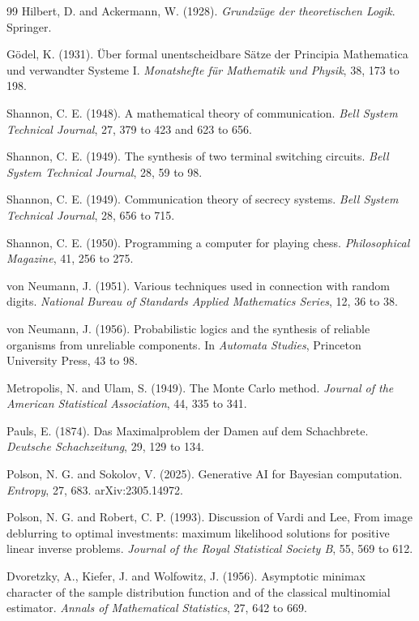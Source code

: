 \documentclass[11pt,twoside,openany]{book}
\theoremstyle{plain}
\theoremstyle{definition}
\theoremstyle{remark}
\begin{document}
\begin{thebibliography}{99}
 Hilbert, D. and Ackermann, W. (1928). \emph{Grundz\"uge der theoretischen Logik}. Springer.

 G\"odel, K. (1931). \"Uber formal unentscheidbare S\"atze der Principia Mathematica und verwandter Systeme I. \emph{Monatshefte f\"ur Mathematik und Physik}, 38, 173 to 198.

 Shannon, C. E. (1948). A mathematical theory of communication. \emph{Bell System Technical Journal}, 27, 379 to 423 and 623 to 656.

 Shannon, C. E. (1949). The synthesis of two terminal switching circuits. \emph{Bell System Technical Journal}, 28, 59 to 98.

 Shannon, C. E. (1949). Communication theory of secrecy systems. \emph{Bell System Technical Journal}, 28, 656 to 715.

 Shannon, C. E. (1950). Programming a computer for playing chess. \emph{Philosophical Magazine}, 41, 256 to 275.

 von Neumann, J. (1951). Various techniques used in connection with random digits. \emph{National Bureau of Standards Applied Mathematics Series}, 12, 36 to 38.

 von Neumann, J. (1956). Probabilistic logics and the synthesis of reliable organisms from unreliable components. In \emph{Automata Studies}, Princeton University Press, 43 to 98.

 Metropolis, N. and Ulam, S. (1949). The Monte Carlo method. \emph{Journal of the American Statistical Association}, 44, 335 to 341.

 Pauls, E. (1874). Das Maximalproblem der Damen auf dem Schachbrete. \emph{Deutsche Schachzeitung}, 29, 129 to 134.

 Polson, N. G. and Sokolov, V. (2025). Generative AI for Bayesian computation. \emph{Entropy}, 27, 683. arXiv:2305.14972.

 Polson, N. G. and Robert, C. P. (1993). Discussion of Vardi and Lee, From image deblurring to optimal investments: maximum likelihood solutions for positive linear inverse problems. \emph{Journal of the Royal Statistical Society B}, 55, 569 to 612.

 Dvoretzky, A., Kiefer, J. and Wolfowitz, J. (1956). Asymptotic minimax character of the sample distribution function and of the classical multinomial estimator. \emph{Annals of Mathematical Statistics}, 27, 642 to 669.


\end{thebibliography}
\end{document}
